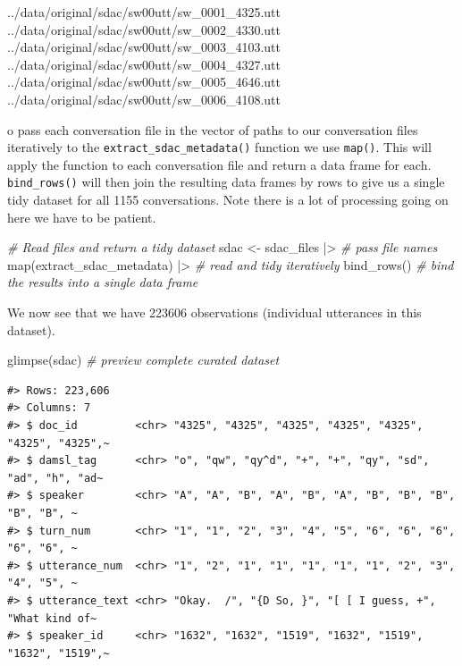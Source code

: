 \documentclass[
  letterpaper,
]{scrbook}
\newenvironment{Shaded}{\begin{snugshade}}{\end{snugshade}}
\newcommand{\CommentTok}[1]{\textcolor[rgb]{0.00,0.00,0.00}{\textit{#1}}}
\newcommand{\FunctionTok}[1]{\textcolor[rgb]{0.00,0.00,0.00}{#1}}
\newcommand{\NormalTok}[1]{\textcolor[rgb]{0.00,0.00,0.00}{#1}}
\newcommand{\OtherTok}[1]{\textcolor[rgb]{0.00,0.00,0.00}{#1}}
\newcommand{\SpecialCharTok}[1]{\textcolor[rgb]{0.00,0.00,0.00}{#1}}
\begin{document}
\begin{Shaded}
\begin{Highlighting}[]
\NormalTok{../data/original/sdac/sw00utt/sw\_0001\_4325.utt}
\NormalTok{../data/original/sdac/sw00utt/sw\_0002\_4330.utt}
\NormalTok{../data/original/sdac/sw00utt/sw\_0003\_4103.utt}
\NormalTok{../data/original/sdac/sw00utt/sw\_0004\_4327.utt}
\NormalTok{../data/original/sdac/sw00utt/sw\_0005\_4646.utt}
\NormalTok{../data/original/sdac/sw00utt/sw\_0006\_4108.utt}
\end{Highlighting}
\end{Shaded}

o pass each conversation file in the vector of paths to our conversation
files iteratively to the \texttt{extract\_sdac\_metadata()} function we
use \texttt{map()}. This will apply the function to each conversation
file and return a data frame for each. \texttt{bind\_rows()} will then
join the resulting data frames by rows to give us a single tidy dataset
for all 1155 conversations. Note there is a lot of processing going on
here we have to be patient.

\begin{Shaded}
\begin{Highlighting}[]
\CommentTok{\# Read files and return a tidy dataset}
\NormalTok{sdac }\OtherTok{\textless{}{-}} 
\NormalTok{  sdac\_files }\SpecialCharTok{|\textgreater{}} \CommentTok{\# pass file names}
  \FunctionTok{map}\NormalTok{(extract\_sdac\_metadata) }\SpecialCharTok{|\textgreater{}} \CommentTok{\# read and tidy iteratively }
  \FunctionTok{bind\_rows}\NormalTok{() }\CommentTok{\# bind the results into a single data frame}
\end{Highlighting}
\end{Shaded}

We now see that we have 223606 observations (individual utterances in
this dataset).

\begin{Shaded}
\begin{Highlighting}[]
\FunctionTok{glimpse}\NormalTok{(sdac) }\CommentTok{\# preview complete curated dataset}
\end{Highlighting}
\end{Shaded}

\begin{verbatim}
#> Rows: 223,606
#> Columns: 7
#> $ doc_id         <chr> "4325", "4325", "4325", "4325", "4325", "4325", "4325",~
#> $ damsl_tag      <chr> "o", "qw", "qy^d", "+", "+", "qy", "sd", "ad", "h", "ad~
#> $ speaker        <chr> "A", "A", "B", "A", "B", "A", "B", "B", "B", "B", "B", ~
#> $ turn_num       <chr> "1", "1", "2", "3", "4", "5", "6", "6", "6", "6", "6", ~
#> $ utterance_num  <chr> "1", "2", "1", "1", "1", "1", "1", "2", "3", "4", "5", ~
#> $ utterance_text <chr> "Okay.  /", "{D So, }", "[ [ I guess, +", "What kind of~
#> $ speaker_id     <chr> "1632", "1632", "1519", "1632", "1519", "1632", "1519",~
\end{verbatim}
\end{document}
